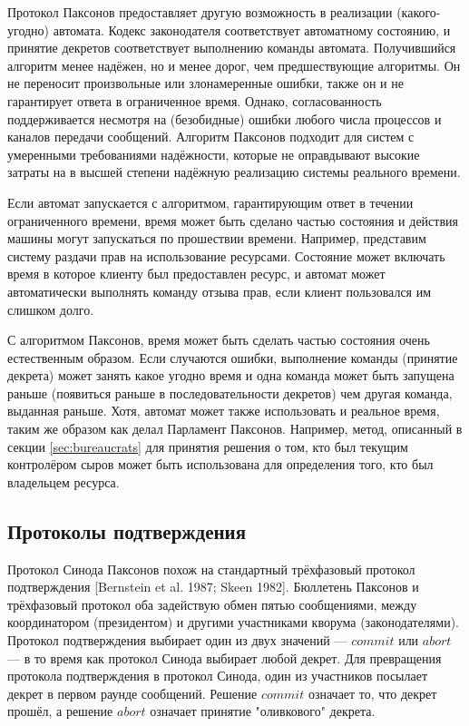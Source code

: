 \documentclass[12pt, a4paper]{article} %
\begin{document}
Протокол Паксонов предоставляет другую возможность в реализации (какого-угодно) автомата. Кодекс законодателя соответствует автоматному состоянию, и принятие декретов соответствует выполнению команды автомата. Получившийся алгоритм менее надёжен, но и менее дорог, чем предшествующие алгоритмы. Он не переносит произвольные или злонамеренные ошибки, также он и не гарантирует ответа в ограниченное время. Однако, согласованность поддерживается несмотря на (безобидные) ошибки любого числа процессов и каналов передачи сообщений. Алгоритм Паксонов подходит для систем с умеренными требованиями надёжности, которые не оправдывают высокие затраты на в высшей степени надёжную реализацию системы реального времени.

Если автомат запускается с алгоритмом, гарантирующим ответ в течении ограниченного времени, время может быть сделано частью состояния и действия машины могут запускаться по прошествии времени. Например, представим систему раздачи прав на использование ресурсами. Состояние может включать время в которое клиенту был предоставлен ресурс, и автомат может автоматически выполнять команду отзыва прав, если клиент пользовался им слишком долго.

С алгоритмом Паксонов, время может быть сделать частью состояния очень естественным образом. Если случаются ошибки, выполнение команды (принятие декрета) может занять какое угодно время и одна команда может быть запущена раньше (появиться раньше в последовательности декретов) чем другая команда, выданная раньше. Хотя, автомат может также использовать и реальное время, таким же образом как делал Парламент Паксонов. Например, метод, описанный в секции \ref{sec:bureaucrats} для принятия решения о том, кто  был текущим контролёром сыров может быть использована для определения того, кто был владельцем ресурса.

\subsection{Протоколы подтверждения}

Протокол Синода Паксонов похож на стандартный трёхфазовый протокол подтверждения [Bernstein et al. 1987; Skeen 1982]. Бюллетень Паксонов и трёхфазовый протокол оба задействую обмен пятью сообщениями, между координатором (президентом) и другими участниками кворума (законодателями). Протокол подтверждения выбирает один из двух значений --- $commit$ или $abort$ --- в то время как протокол Синода выбирает любой декрет. Для превращения протокола подтверждения в протокол Синода, один из участников посылает декрет в первом раунде сообщений. Решение $commit$ означает то, что декрет прошёл, а решение $abort$ означает принятие "оливкового" декрета.
\end{document}

